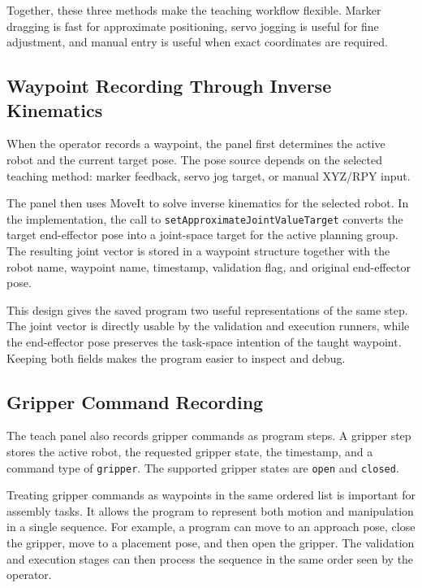 Together, these three methods make the teaching workflow flexible. Marker dragging is fast for approximate positioning, servo jogging is useful for fine adjustment, and manual entry is useful when exact coordinates are required.

\subsection{Waypoint Recording Through Inverse Kinematics}

When the operator records a waypoint, the panel first determines the active robot and the current target pose. The pose source depends on the selected teaching method: marker feedback, servo jog target, or manual XYZ/RPY input.

The panel then uses MoveIt to solve inverse kinematics for the selected robot. In the implementation, the call to \texttt{setApproximateJointValueTarget} converts the target end-effector pose into a joint-space target for the active planning group. The resulting joint vector is stored in a waypoint structure together with the robot name, waypoint name, timestamp, validation flag, and original end-effector pose.

This design gives the saved program two useful representations of the same step. The joint vector is directly usable by the validation and execution runners, while the end-effector pose preserves the task-space intention of the taught waypoint. Keeping both fields makes the program easier to inspect and debug.

\subsection{Gripper Command Recording}

The teach panel also records gripper commands as program steps. A gripper step stores the active robot, the requested gripper state, the timestamp, and a command type of \texttt{gripper}. The supported gripper states are \texttt{open} and \texttt{closed}.

Treating gripper commands as waypoints in the same ordered list is important for assembly tasks. It allows the program to represent both motion and manipulation in a single sequence. For example, a program can move to an approach pose, close the gripper, move to a placement pose, and then open the gripper. The validation and execution stages can then process the sequence in the same order seen by the operator.

